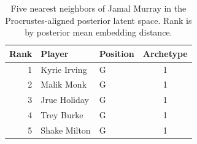 \begin{table}[htbp]
  \centering\small
  \begin{tabular}{rllc}
    \toprule
    Rank & Player & Position & Archetype \\
    \midrule
    1 & Kyrie Irving & G & 1 \\
    2 & Malik Monk & G & 1 \\
    3 & Jrue Holiday & G & 1 \\
    4 & Trey Burke & G & 1 \\
    5 & Shake Milton & G & 1 \\
    \bottomrule
  \end{tabular}
  \caption{Five nearest neighbors of Jamal Murray in the Procrustes-aligned posterior latent space. Rank is by posterior mean embedding distance.}
  \label{tab:Jamal_Murray_neighbors}
\end{table}

